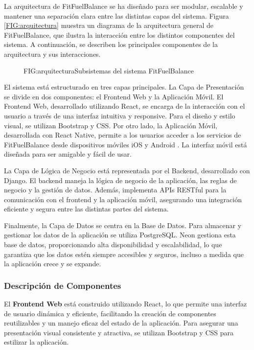 La arquitectura de FitFuelBalance se ha diseñado para ser modular, escalable y mantener una separación clara entre las distintas capas del sistema. Figura \ref{FIG:arquitectura} muestra un diagrama de la arquitectura general de FitFuelBalance, que ilustra la interacción entre los distintos componentes del sistema. A continuación, se describen los principales componentes de la arquitectura y sus interacciones.

\begin{figure}[Distribución Arquitectura]{FIG:arquitectura}{Subsistemas del sistema FitFuelBalance}
\end{figure}

El sistema está estructurado en tres capas principales. La Capa de Presentación se divide en dos componentes: el Frontend Web y la Aplicación Móvil. El Frontend Web, desarrollado utilizando React, se encarga de la interacción con el usuario a través de una interfaz intuitiva y responsive. Para el diseño y estilo visual, se utilizan Bootstrap y CSS. Por otro lado, la Aplicación Móvil, desarrollada con React Native, permite a los usuarios acceder a los servicios de FitFuelBalance desde dispositivos móviles iOS \cite{iOS} y Android \cite{Android}. La interfaz móvil está diseñada para ser amigable y fácil de usar.

La Capa de Lógica de Negocio está representada por el Backend, desarrollado con Django. El backend maneja la lógica de negocio de la aplicación, las reglas de negocio y la gestión de datos. Además, implementa APIs RESTful \cite{RESTfulAPI} para la comunicación con el frontend y la aplicación móvil, asegurando una integración eficiente y segura entre las distintas partes del sistema.

Finalmente, la Capa de Datos se centra en la Base de Datos. Para almacenar y gestionar los datos de la aplicación se utiliza PostgreSQL. Neon gestiona esta base de datos, proporcionando alta disponibilidad y escalabilidad, lo que garantiza que los datos estén siempre accesibles y seguros, incluso a medida que la aplicación crece y se expande.

\subsubsection{Descripción de Componentes}

    El \textbf{Frontend Web} está construido utilizando React, lo que permite una interfaz de usuario dinámica y eficiente, facilitando la creación de componentes reutilizables y un manejo eficaz del estado de la aplicación. Para asegurar una presentación visual consistente y atractiva, se utilizan Bootstrap y CSS para estilizar la aplicación.
    
